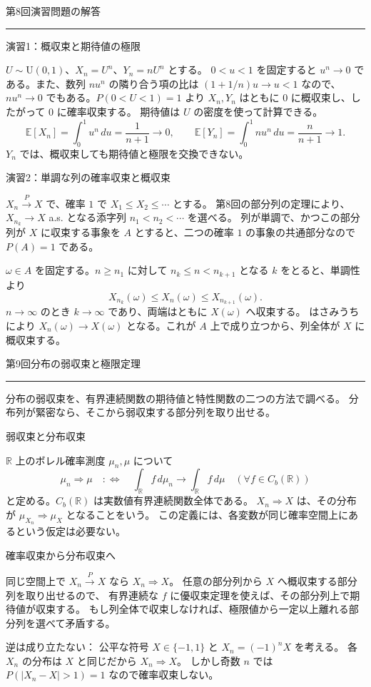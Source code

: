\documentclass[a4paper,10pt,pdflatex,ja=standard,jafont=ipaex-type1,
  magstyle=real,scale=1]{bxjsarticle}
\newcommand{\coursename}{確率論と統計学 I}
\newcommand{\topic}[1]{\par\vspace{5pt}
  {\large\sffamily\mdseries\color{accent}#1}\par\vspace{2pt}}
\newcommand{\handouttitle}[1]{%
  \begin{center}
    {\Large\color{ink}#1}\par\vspace{3mm}
    {\color{accent}\rule{0.88\linewidth}{0.7pt}}
  \end{center}\vspace{-2mm}}
\newcommand{\keybox}[1]{\par\vspace{3pt}\begingroup
  \setlength{\fboxsep}{5pt}
  \colorbox{soft}{\parbox{\dimexpr\linewidth-2\fboxsep\relax}{#1}}%
  \endgroup\par\vspace{2pt}}
\newcommand{\examplelabel}[1]{{\sffamily\mdseries\color{ink}#1}}
\newcommand{\R}{\mathbb R}
\newcommand{\E}{\mathbb E}
\begin{document}
\fontsize{10pt}{13.5pt}\selectfont
\begingroup
\fancyhead[L]{\small\color{ink}\coursename{}・前回の演習解答}
\handouttitle{第8回\quad 演習問題の解答}

\topic{演習1：概収束と期待値の極限}
$U\sim\mathrm U(0,1)$、$X_n=U^n$、$Y_n=nU^n$ とする。
$0<u<1$ を固定すると $u^n\to0$ である。また、数列 $nu^n$ の隣り合う項の比は
$(1+1/n)u\to u<1$ なので、$nu^n\to0$ でもある。$P(0<U<1)=1$ より
$X_n,Y_n$ はともに $0$ に概収束し、したがって $0$ に確率収束する。
期待値は $U$ の密度を使って計算できる。
$$
  \E[X_n]=\int_0^1u^n\,du=\frac1{n+1}\longrightarrow0,\qquad
  \E[Y_n]=\int_0^1nu^n\,du=\frac n{n+1}\longrightarrow1.
$$
$Y_n$ では、概収束しても期待値と極限を交換できない。

\topic{演習2：単調な列の確率収束と概収束}
$X_n\xrightarrow{P}X$ で、確率 $1$ で $X_1\le X_2\le\cdots$ とする。
第8回の部分列の定理により、$X_{n_k}\to X$ a.s. となる添字列 $n_1<n_2<\cdots$ を選べる。
列が単調で、かつこの部分列が $X$ に収束する事象を $A$ とすると、二つの確率 $1$ の事象の共通部分なので
$P(A)=1$ である。

$\omega\in A$ を固定する。$n\ge n_1$ に対して $n_k\le n<n_{k+1}$ となる $k$ をとると、単調性より
$$X_{n_k}(\omega)\le X_n(\omega)\le X_{n_{k+1}}(\omega).$$
$n\to\infty$ のとき $k\to\infty$ であり、両端はともに $X(\omega)$ へ収束する。
はさみうちにより $X_n(\omega)\to X(\omega)$ となる。これが $A$ 上で成り立つから、列全体が $X$ に概収束する。
\clearpage
\endgroup

\handouttitle{第9回\quad 分布の弱収束と極限定理}
\keybox{分布の弱収束を、有界連続関数の期待値と特性関数の二つの方法で調べる。
分布列が緊密なら、そこから弱収束する部分列を取り出せる。}

\topic{弱収束と分布収束}
$\R$ 上のボレル確率測度 $\mu_n,\mu$ について
$$\mu_n\Rightarrow\mu\quad:\Longleftrightarrow\quad
 \int_\R f\,d\mu_n\to\int_\R f\,d\mu
 \quad(\forall f\in C_b(\R))$$
と定める。$C_b(\R)$ は実数値有界連続関数全体である。
$X_n\Rightarrow X$ は、その分布が $\mu_{X_n}\Rightarrow\mu_X$ となることをいう。
この定義には、各変数が同じ確率空間上にあるという仮定は必要ない。

\topic{確率収束から分布収束へ}
同じ空間上で $X_n\xrightarrow{P}X$ なら $X_n\Rightarrow X$。
任意の部分列から $X$ へ概収束する部分列を取り出せるので、
有界連続な $f$ に優収束定理を使えば、その部分列上で期待値が収束する。
もし列全体で収束しなければ、極限値から一定以上離れる部分列を選べて矛盾する。

\examplelabel{逆は成り立たない：}
公平な符号 $X\in\{-1,1\}$ と $X_n=(-1)^nX$ を考える。
各 $X_n$ の分布は $X$ と同じだから $X_n\Rightarrow X$。
しかし奇数 $n$ では $P(|X_n-X|>1)=1$ なので確率収束しない。
\end{document}
